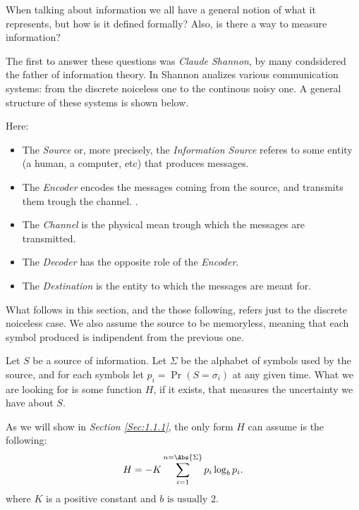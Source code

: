 \documentclass{subfiles}
\begin{document}
    When talking about information we all have a general notion of what it represents,
        but how is it defined formally? 
        Also, is there a way to measure information?

    The first to answer these questions was \emph{Claude Shannon}, 
        by many condsidered the father of information theory.
    In \cite{shannon1948} Shannon analizes various communication systems:
        from the discrete noiceless one to the continous noisy one.
        A general structure of these systems is shown below.
        

    Here:
    \begin{itemize}
        \item The \emph{Source} or, more precisely, 
            the \emph{Information Source} referes to some entity
            (a human, a computer, etc) that produces messages.

        \item The \emph{Encoder} encodes the messages coming from the source,
            and transmits them trough the channel.
.
        \item The \emph{Channel} is the physical mean trough which the messages
            are transmitted.

        \item The \emph{Decoder} has the opposite role of the \emph{Encoder}.
        \item The \emph{Destination} is the entity to which the messages are meant for.
    \end{itemize}

    \begin{remark*}
        What follows in this section, and the those following,
        refers just to the discrete noiceless case. 
        We also assume the source to be memoryless, 
        meaning that each symbol produced is indipendent from the previous one.
    \end{remark*}

    Let \(S\) be a source of information. 
    Let \(\Sigma\) be the alphabet of symbols used by the source,
    and for each symbols let \(p_{i} = \Pr(S = \sigma_{i})\) at any given time.
    What we are looking for is some function \(H\), if it exists,
    that measures the uncertainty we have about \(S\).

    As we will show in \emph{Section \ref{Sec:1.1.1}}, 
        the only form \(H\) can assume is the following:
    \begin{equation}\label{Eq:1}
        H = -K \sum_{i = 1}^{n = \Abs{\Sigma}}{p_{i} \log_{b} p_{i}}.
    \end{equation}
    where \(K\) is a positive constant and \(b \text{ is usually } 2\).
 
\end{document}
